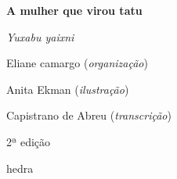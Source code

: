 




\begingroup\thispagestyle{empty}\vspace*{.05\textheight} 

              \formular
              \huge
              \noindent
              \textbf{A mulher que virou tatu}

              \bigskip  
              
              \large
              \noindent
              \textit{Yuxabu yaixni}
              \vspace{12.5em}
              
              \newfontfamily{}
              {\selectfont\garamond\small\noindent Eliane camargo (\textit{organização})}

              {\selectfont\garamond\small\noindent Anita Ekman (\textit{ilustração})}

              {\selectfont\garamond\small\noindent Capistrano de Abreu (\textit{transcrição})}

              \bigskip

              \noindent
              {\selectfont\garamond\small\noindent 2ª edição}

              \vfill

              \newfontfamily{}
              {\noindent\fontsize{30}{40}\selectfont \timesnewroman hedra}



\endgroup
\pagebreak
